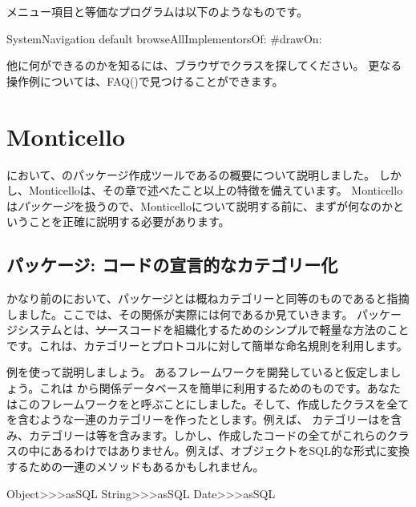 \documentclass[a4paper,10pt,twoside]{book}
\begin{document}
メニュー項目と等価なプログラムは以下のようなものです。
\begin{code}{}
SystemNavigation default browseAllImplementorsOf: #drawOn:
\end{code}

他に何ができるのかを知るには、ブラウザでクラスを探してください。
更なる操作例については、FAQ()で見つけることができます。

\section{Monticello}

において、\pharo のパッケージ作成ツールであるの概要について説明しました。
しかし、Monticelloは、その章で述べたこと以上の特徴を備えています。
Monticelloは\emph{パッケージ}を扱うので、Monticelloについて説明する前に、まずが何なのかということを正確に説明する必要があります。

\subsection{パッケージ: \pharo コードの宣言的なカテゴリー化}

かなり前のにおいて、パッケージとは概ねカテゴリーと同等のものであると指摘しました。ここでは、その関係が実際には何であるか見ていきます。
パッケージシステムとは、\st ソースコードを組織化するためのシンプルで軽量な方法のことです。これは、カテゴリーとプロトコルに対して簡単な命名規則を利用します。

例を使って説明しましょう。
あるフレームワークを開発していると仮定しましょう。これは \pharo から関係データベースを簡単に利用するためのものです。あなたはこのフレームワークをと呼ぶことにしました。そして、作成したクラスを全てを含むような一連のカテゴリーを作ったとします。例えば、
カテゴリーはを含み、カテゴリーは等を含みます。しかし、作成したコードの全てがこれらのクラスの中にあるわけではありません。例えば、オブジェクトをSQL的な形式に変換するための一連のメソッドもあるかもしれません。

\begin{code}{}
Object>>>asSQL
String>>>asSQL
Date>>>asSQL
\end{code}
\end{document}
